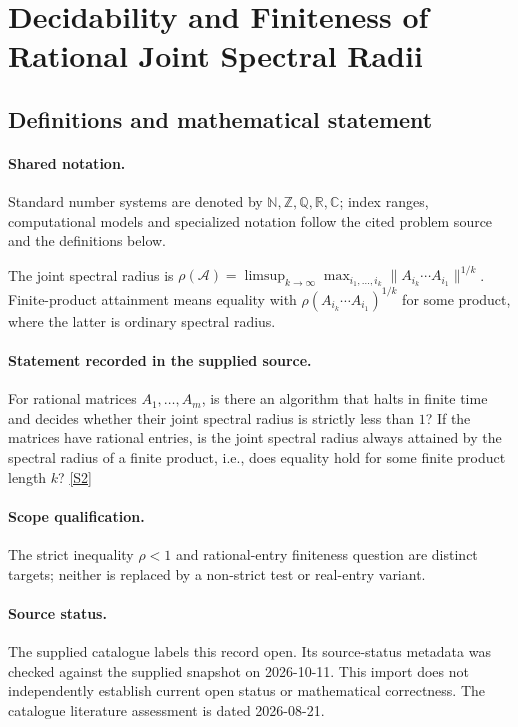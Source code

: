 \documentclass[11pt]{article}
\newcommand{\sref}[2]{\hyperlink{source:#1:#2}{[S#2]}}
\begin{document}
\section{Decidability and Finiteness of Rational Joint Spectral Radii}\label{statement}

\subsection{Definitions and mathematical statement}

\paragraph{Shared notation.}Standard number systems are denoted by $\mathbb N,\mathbb Z,\mathbb Q,\mathbb R,\mathbb C$; index ranges, computational models and specialized notation follow the cited problem source and the definitions below.


The joint spectral radius is $\rho(\mathcal A)=\limsup_{k\to\infty}\max_{i_1,\ldots,i_k}\lVert A_{i_k}\cdots A_{i_1}\rVert^{1/k}$. Finite-product attainment means equality with $\rho(A_{i_k}\cdots A_{i_1})^{1/k}$ for some product, where the latter is ordinary spectral radius.
\paragraph{Statement recorded in the supplied source.}
For rational matrices $A_1,\ldots,A_m$, is there an algorithm that halts in finite time and decides whether their joint spectral radius is strictly less than $1$? If the matrices have rational entries, is the joint spectral radius always attained by the spectral radius of a finite product, i.e., does equality hold for some finite product length $k$? \sref{statement}{2}
\paragraph{Scope qualification.}
The strict inequality $\rho<1$ and rational-entry finiteness question are distinct targets; neither is replaced by a non-strict test or real-entry variant.
\paragraph{Source status.}
The supplied catalogue labels this record open. Its source-status metadata was checked against the supplied snapshot on 2026-10-11. This import does not independently establish current open status or mathematical correctness. The catalogue literature assessment is dated 2026-08-21.
\end{document}

